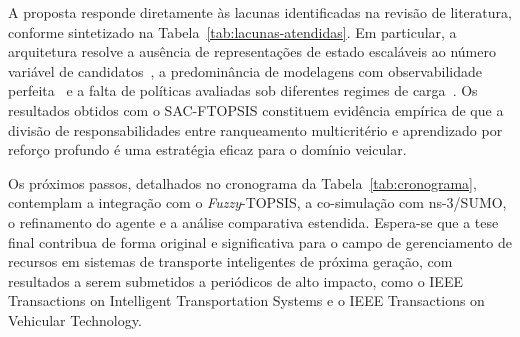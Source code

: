 A proposta responde diretamente às lacunas identificadas na revisão de literatura, conforme sintetizado na Tabela~\ref{tab:lacunas-atendidas}. Em particular, a arquitetura resolve a ausência de representações de estado escaláveis ao número variável de candidatos~\cite{miriyala2026, uddin2025}, a predominância de modelagens com observabilidade perfeita~\cite{liu2025} e a falta de políticas avaliadas sob diferentes regimes de carga~\cite{Moghaddasi2023}. Os resultados obtidos com o \gls{SAC}-FTOPSIS constituem evidência empírica de que a divisão de responsabilidades entre ranqueamento multicritério e aprendizado por reforço profundo é uma estratégia eficaz para o domínio veicular.

\begin{table}[ht!]
    \centering
\end{table}

Os próximos passos, detalhados no cronograma da Tabela~\ref{tab:cronograma}, contemplam a integração com o \textit{Fuzzy}-\gls{TOPSIS}, a co-simulação com ns-3/SUMO, o refinamento do agente e a análise comparativa estendida. Espera-se que a tese final contribua de forma original e significativa para o campo de gerenciamento de recursos em sistemas de transporte inteligentes de próxima geração, com resultados a serem submetidos a periódicos de alto impacto, como o IEEE Transactions on Intelligent Transportation Systems e o IEEE Transactions on Vehicular Technology.

